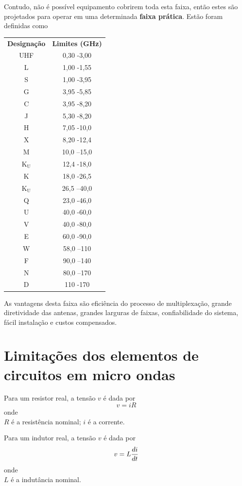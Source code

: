 Contudo, não é possível equipamento cobrirem toda esta faixa, então estes são projetados para operar em uma  determinada \textbf{faixa prática}. Estão foram definidas como\\
\begin{center}
	\begin{longtable}{cc}
		\textbf{Designação}&\textbf{Limites (GHz)}\\
		UHF&0,30 -3,00\\
		L &1,00 -1,55\\
		S &1,00 -3,95\\
		G &3,95 -5,85\\
		C &3,95 -8,20\\
		J &5,30 -8,20\\
		H &7,05 -10,0\\
		X &8,20 -12,4\\
		M &10,0 –15,0\\
		K$_{\text{U}}$ &12,4 -18,0\\
		K &18,0 -26,5\\
		K$_{\text{U}}$ &26,5 –40,0\\
		Q &23,0 -46,0\\
		U&40,0 -60,0\\
		V&40,0 -80,0\\
		E&60,0 -90,0\\
		W&58,0 –110\\
		F&90,0 –140\\
		N&80,0 –170\\
		D&110 -170\\
	\end{longtable}
\end{center}



As vantagens desta faixa são eficiência do processo de multiplexação,  grande diretividade das antenas, grandes larguras de faixas, confiabilidade do sistema, fácil instalação e custos compensados.

\section{Limitações dos elementos de circuitos em micro ondas}

Para um resistor real, a tensão $v$ é dada por
\begin{equation}
	v=iR
\end{equation}
onde\\
$R$ é a resistência nominal;
$i$ é a corrente.


Para um indutor real, a tensão $v$ é dada por
\begin{equation}
	v=L\displaystyle \frac{\displaystyle di }{ \displaystyle dt}
\end{equation}
onde\\
$L$ é a indutância nominal.


